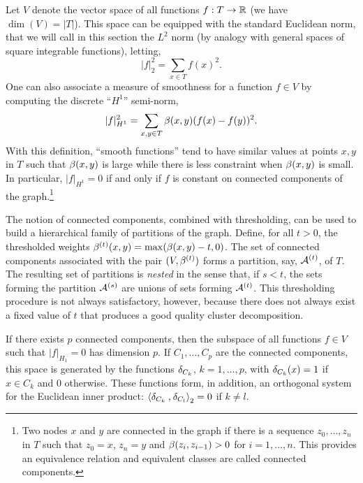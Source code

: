   Let $V$ denote the vector space of all functions $f: T\to {\mathbb{R}}$ (we have $\dim(V) = |T|$). This space can be equipped with the standard Euclidean norm, that we will call in this section the $L^2$ norm (by analogy with general spaces of square integrable functions), letting,
\[
|f|_2^2 = \sum_{x\in T} f(x)^2.
\]
One can also associate a measure of smoothness for a function $f\in V$ by computing the discrete ``$H^1$'' semi-norm,
\[
|f|^2_{H^1} = \sum_{x,y\in T} \beta(x,y) (f(x)-f(y))^2.
\]
With this definition, ``smooth functions'' tend to have similar values at points $x,y$ in $T$ such that $\beta(x,y)$ is large while there is  less constraint when $\beta(x,y)$ is small. In particular, $|f|_{H^1} = 0$ if and only if $f$ is constant on connected components of the graph.\footnote{Two nodes $x$ and $y$ are connected in the graph if there is a sequence $z_0, \ldots, z_n$ in $T$ such that $z_0=x$, $z_n = y$ and $\beta(z_i, z_{i-1}) > 0$ for $i=1, \ldots, n$. This provides an equivalence relation and equivalent classes are called connected components. }

The notion of connected components, combined with thresholding, can be used to build a hierarchical family of partitions of the graph. Define, for all $t>0$, the thresholded weights $\beta^{(t)}(x,y) = \max(\beta(x,y) - t, 0)$. The set of connected components associated with the pair $(V, \beta^{(t)})$ forms a partition, say, ${\mathcal A}^{(t)}$, of $T$. The resulting set of partitions is {\em nested} in the sense that, if $s < t$, the sets forming the partition ${\mathcal A}^{(s)}$ are unions of sets forming ${\mathcal A}^{(t)}$.
 This thresholding procedure is not always satisfactory, however, because there does not always exist a fixed value of $t$ that produces a good quality cluster decomposition.

If there exists $p$ connected components, then the subspace of all functions $f\in V$ such that $|f|_{H_1} = 0$ has dimension $p$. If $C_1, \ldots, C_p$ are the connected components, this space is generated by the functions $\delta_{C_k}$, $k=1, \ldots, p$, with $\delta_{C_k}(x) = 1$ if $x\in C_k$ and 0 otherwise. These functions form, in addition, an orthogonal system for the Euclidean inner product: ${\langle {\delta_{C_k}}\mathbin{,} {\delta_{C_l}}\rangle}_2 = 0$ if $k\neq l$. 

